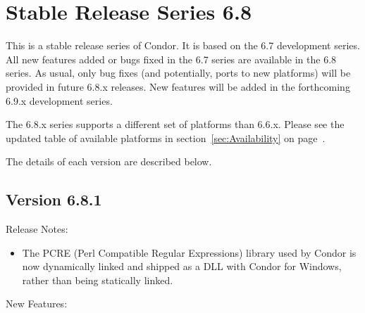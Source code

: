 \section{\label{sec:History-6-8}Stable Release Series 6.8}

This is a stable release series of Condor.
It is based on the 6.7 development series.
All new features added or bugs fixed in the 6.7 series are available
in the 6.8 series.
As usual, only bug fixes (and potentially, ports to new platforms)
will be provided in future 6.8.x releases.
New features will be added in the forthcoming 6.9.x development series.


The 6.8.x series supports a different set of platforms than 6.6.x.
Please see the updated table of available platforms in
section~\ref{sec:Availability} on page~\pageref{sec:Availability}.

The details of each version are described below.


\subsection*{\label{sec:New-6-8-1}Version 6.8.1}

\noindent Release Notes:

\begin{itemize}

\item The PCRE (Perl Compatible Regular Expressions) library used by
Condor is now dynamically linked and shipped as a DLL with Condor for
Windows, rather than being statically linked.

\end{itemize}


\noindent New Features:

